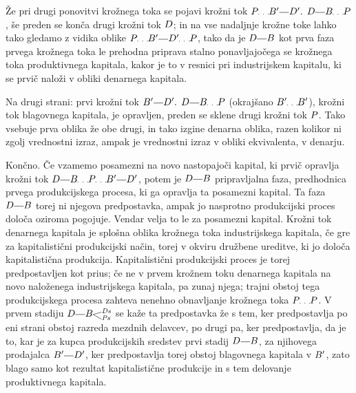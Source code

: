 \documentclass[kapital_02.tex]{subfiles}
\begin{document}
Že pri drugi ponovitvi krožnega toka se pojavi krožni tok \( \KPEP \KPEpike \KPEB' \KPEcrta \KPED'\textrm{. } \KPED \KPEcrta \KPEB \KPEpike \KPEP \), še preden se konča drugi krožni tok \( D \); in na vse nadaljnje krožne toke lahko tako gledamo z vidika oblike \( \KPEP \KPEpike \KPEB' \KPEcrta \KPED' \KPEpike \KPEP \), tako da je \( \KPED \KPEcrta \KPEB \) kot prva faza prvega krožnega toka le prehodna priprava stalno ponavljajočega se krožnega toka produktivnega kapitala, kakor je to v resnici pri industrijskem kapitalu, ki se prvič naloži v obliki denarnega kapitala.

Na drugi strani: prvi krožni tok \( \KPEB' \KPEcrta \KPED'\textrm{. } \KPED \KPEcrta \KPEB \KPEpike \KPEP\) (okrajšano \( \KPEB' \KPEpike \KPEB' \)), krožni tok blagovnega kapitala, je opravljen, preden se sklene drugi krožni tok \( P \). Tako vsebuje prva oblika že obe drugi, in tako izgine denarna oblika, razen kolikor ni zgolj vrednostni izraz, ampak je vrednostni izraz v obliki ekvivalenta, v denarju.

Končno. Če vzamemo posamezni na novo nastopajoči kapital, ki prvič opravlja krožni tok \( \KPED \KPEcrta \KPEB \KPEpike \KPEP \KPEpike \KPEB' \KPEcrta \KPED' \), potem je \( \KPED \KPEcrta \KPEB \) pripravljalna faza, predhodnica prvega produkcijskega procesa, ki ga opravlja ta posamezni kapital. Ta faza \( \KPED \KPEcrta \KPEB \) torej ni njegova predpostavka, ampak jo nasprotno produkcijski proces določa oziroma pogojuje. Vendar velja to le za posamezni kapital. Krožni tok denarnega kapitala je splošna oblika krožnega toka industrijskega kapitala, če gre za kapitalistični produkcijski način, torej v okviru družbene ureditve, ki jo določa kapitalistična produkcija. Kapitalistični produkcijski proces je torej predpostavljen kot prius; če ne v prvem krožnem toku denarnega kapitala na novo naloženega industrijskega kapitala, pa zunaj njega; trajni obstoj tega produkcijskega procesa zahteva nenehno obnavljanje krožnega toka \( \KPEP \KPEpike \KPEP \). V prvem stadiju \( \KPED \KPEcrta \KPEBrazcepDsPs \) se kaže ta predpostavka že s tem, ker predpostavlja po eni strani obstoj razreda mezdnih delavcev, po drugi pa, ker predpostavlja, da je to, kar je za kupca produkcijskih sredstev prvi stadij \( \KPED \KPEcrta \KPEB \), za njihovega prodajalca \( \KPEB' \KPEcrta \KPED' \), ker predpostavlja torej obstoj blagovnega kapitala v \( B' \), zato blago samo kot rezultat kapitalistične produkcije in s tem delovanje produktivnega kapitala.
\end{document}
